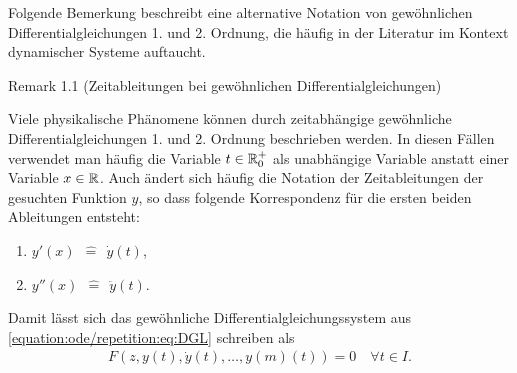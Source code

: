 \par
Folgende Bemerkung beschreibt eine alternative Notation von gewöhnlichen Differentialgleichungen 1. und 2. Ordnung, die häufig in der Literatur im Kontext dynamischer Systeme auftaucht.
\label{ode/repetition:remark-1}
\begin{emphBox}{}{}{Remark 1.1 (Zeitableitungen bei gewöhnlichen Differentialgleichungen)}



\par
Viele physikalische Phänomene können durch zeitabhängige gewöhnliche Differentialgleichungen 1. und 2. Ordnung beschrieben werden.
In diesen Fällen verwendet man häufig die Variable \(t \in \mathbb{R}^+_0\) als unabhängige Variable anstatt einer Variable \(x \in \mathbb{R}\).
Auch ändert sich häufig die Notation der Zeitableitungen der gesuchten Funktion \(y\), so dass folgende Korrespondenz für die ersten beiden Ableitungen entsteht:
\begin{enumerate}

\item {} 
\par
\(y'(x) \ \ \hat{=} \ \ \dot{y}(t)\),

\item {} 
\par
\(y''(x) \ \ \hat{=} \ \ \ddot{y}(t)\).

\end{enumerate}

\par
Damit lässt sich das gewöhnliche Differentialgleichungssystem aus \eqref{equation:ode/repetition:eq:DGL} schreiben als
\begin{align}\label{equation:ode/repetition:eq:DGL_time}
F(z, y(t), \dot{y}(t), \ldots, y{(m)}(t)) = 0 \quad \forall t\in I.
\end{align}\end{emphBox}


